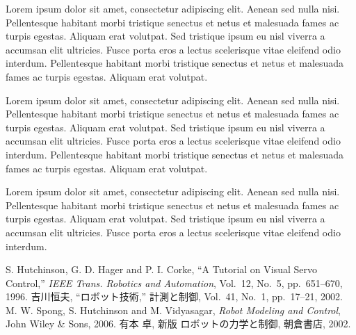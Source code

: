 \begin{multicols}{2}
Lorem ipsum dolor sit amet, consectetur adipiscing elit. Aenean sed
nulla nisi. Pellentesque habitant morbi tristique senectus et netus et malesuada
fames ac turpis egestas. Aliquam erat volutpat. Sed tristique ipsum eu nisl
viverra a accumsan elit ultricies. Fusce porta eros a lectus scelerisque vitae
eleifend odio interdum. Pellentesque habitant morbi tristique senectus et netus
et malesuada fames ac turpis egestas. Aliquam erat volutpat.

Lorem ipsum dolor sit amet, consectetur adipiscing elit. Aenean sed
nulla nisi. Pellentesque habitant morbi tristique senectus et netus et malesuada
fames ac turpis egestas. Aliquam erat volutpat. Sed tristique ipsum eu nisl
viverra a accumsan elit ultricies. Fusce porta eros a lectus scelerisque vitae
eleifend odio interdum. Pellentesque habitant morbi tristique senectus et netus
et malesuada fames ac turpis egestas. Aliquam erat volutpat.

Lorem ipsum dolor sit amet, consectetur adipiscing elit. Aenean sed
nulla nisi. Pellentesque habitant morbi tristique senectus et netus et malesuada
fames ac turpis egestas. Aliquam erat volutpat. Sed tristique ipsum eu nisl
viverra a accumsan elit ultricies. Fusce porta eros a lectus scelerisque vitae
eleifend odio interdum.

\begin{thebibliography}{99}
S. Hutchinson, G. D. Hager and P. I. Corke,
``A Tutorial on Visual Servo Control,''
{\it IEEE Trans. Robotics and Automation},
Vol.~12, No.~5, pp.~651--670, 1996.
%
吉川恒夫,
``ロボット技術,''
計測と制御, Vol.~41, No.~1, pp.~17--21, 2002.
%
M. W. Spong, S. Hutchinson and M. Vidyasagar, 
{\it Robot Modeling and Control}, 
John Wiley \& Sons, 2006. 
%
有本 卓, 新版 ロボットの力学と制御, 朝倉書店, 2002. 
\end{thebibliography}

\newpage %

\end{multicols}








